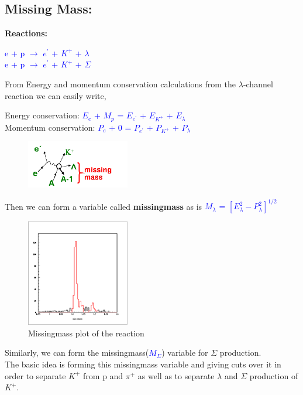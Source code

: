 \documentclass[aps,11pt]{revtex4}
\begin{document}
\newpage
\subsection{Missing Mass:}
\label{sec:Missing Mass:}
\noindent\textbf{
Reactions:}
\begin{center}
\textcolor{blue}{
e + p $\longrightarrow$ $e^\prime$ + $K^+$ + $\lambda$ \\
e + p $\longrightarrow$ $e^\prime$ + $K^+$ + $\Sigma$
}
\end{center}
From Energy and momentum conservation calculations from the $\lambda$-channel reaction we can easily write,
\begin{center}
Energy conservation: \textcolor{blue}{$E_e$ + $M_p$ = $E_{e^\prime}$ + $E_{K^+}$ + $E_{\lambda}$} \\ 
Momentum conservation: \textcolor{blue}{$P_e$ + 0 = $P_{e^\prime}$ + $P_{K^+}$ + $P_{\lambda}$} \\
\end{center}

\begin{figure}[!h]
\begin{flushright}
	\includegraphics[width=0.40\textwidth]{reaction.png}
	\label{fig:reaction}
	\end{flushright}
\end{figure}
\begin{flushleft}
Then we can form a variable called \textbf{missingmass} as is 
\textcolor{blue}{$M_\lambda$ =  $[E_\lambda^2 - P_\lambda^2 ]^{1/2}$}
\end{flushleft}

\begin{figure}[h]
	\centering
		\includegraphics[width=0.40\textwidth]{missmass.png}
	\caption{Missingmass plot of the reaction}
	\label{fig:missmass}
\end{figure}
\noindent
Similarly, we can form the missingmass(\textcolor{blue}{$M_\Sigma$}) variable for $\Sigma$ production.\\
The basic idea is forming this missingmass variable and giving cuts over it in order to separate $K^+$ from p and $\pi^+$ as well as to separate $\lambda$ and $\Sigma$ production of $K^+$.
\end{document}
